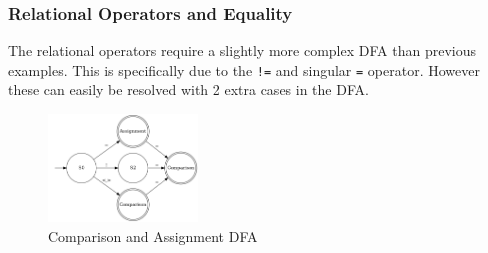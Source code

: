 \documentclass[11pt]{article}
\begin{document}
\subsubsection{Relational Operators and Equality}
\label{sec:org2a613d8}

The relational operators require a slightly more complex DFA than previous examples. This is specifically due to the \texttt{!=} and singular \texttt{=} operator. However these can easily be resolved with 2 extra cases in the DFA.

\begin{figure}[htbp]
\centering
\includegraphics[width=150px]{automaton/eq_comp.png}
\caption{\label{fig:eq-comp-dfa}Comparison and Assignment DFA}
\end{figure}
\end{document}

